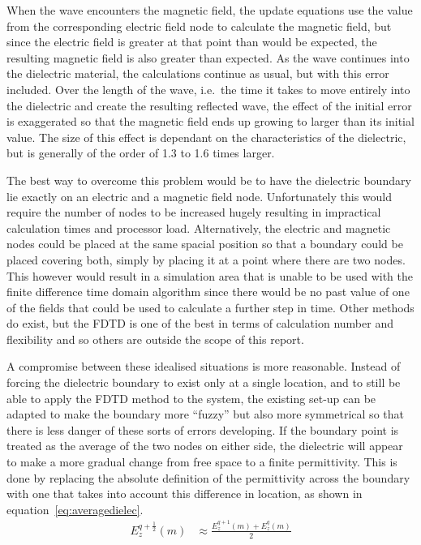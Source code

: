 When the wave encounters the magnetic field, the update equations use the value from the corresponding electric field node to calculate the magnetic field, but since the electric field is greater at that point than would be expected, the resulting magnetic field is also greater than expected. As the wave continues into the dielectric material, the calculations continue as usual, but with this error included. Over the length of the wave, i.e.\ the time it takes to move entirely into the dielectric and create the resulting reflected wave, the effect of the initial error is exaggerated so that the magnetic field ends up growing to larger than its initial value. The size of this effect is dependant on the characteristics of the dielectric, but is generally of the order of 1.3 to 1.6 times larger.

The best way to overcome this problem would be to have the dielectric boundary lie exactly on an electric and a magnetic field node. Unfortunately this would require the number of nodes to be increased hugely resulting in impractical calculation times and processor load. Alternatively, the electric and magnetic nodes could be placed at the same spacial position so that a boundary could be placed covering both, simply by placing it at a point where there are two nodes. This however would result in a simulation area that is unable to be used with the finite difference time domain algorithm since there would be no past value of one of the fields that could be used to calculate a further step in time. Other methods do exist, but the FDTD is one of the best in terms of calculation number and flexibility and so others are outside the scope of this report.

A compromise between these idealised situations is more reasonable. Instead of forcing the dielectric boundary to exist only at a single location, and to still be able to apply the FDTD method to the system, the existing set-up can be adapted to make the boundary more ``fuzzy'' but also more symmetrical so that there is less danger of these sorts of errors developing. If the boundary point is treated as the average of the two nodes on either side, the dielectric will appear to make a more gradual change from free space to a finite permittivity. This is done by replacing the absolute definition of the permittivity across the boundary with one that takes into account this difference in location, as shown in equation~\ref{eq:averagedielec}.
\begin{align}
	E^{q+\frac{1}{2}}_z(m) &\approx \frac{E^{q+1}_z(m)+E^q_z(m)}{2} \label{eq:averagedielec}
\end{align}

